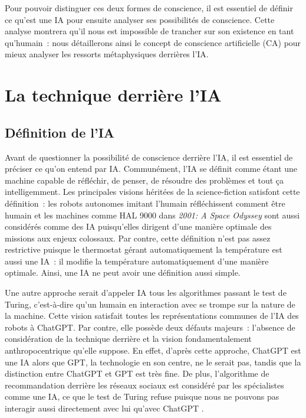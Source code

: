 \documentclass[a4paper, titlepage, 12pt]{article}
\begin{document}
	Pour pouvoir distinguer ces deux formes de conscience, il est essentiel de définir ce qu'est une IA pour ensuite analyser ses possibilités de conscience. Cette analyse montrera qu'il nous est impossible de trancher sur son existence en tant qu'humain~: nous détaillerons ainsi le concept de conscience artificielle (CA) pour mieux analyser les ressorts métaphysiques derrières l'IA.

	\newpage
	\section{La technique derrière l'IA}
	\subsection{Définition de l'IA}
	Avant de questionner la possibilité de conscience derrière l'IA, il est essentiel de préciser ce qu'on entend par IA. Communément, l'IA se définit comme étant une machine capable de réfléchir, de penser, de résoudre des problèmes et tout ça intelligemment. Les principales visions héritées de la science-fiction satisfont cette définition~: les robots autonomes imitant l'humain réfléchissent comment être humain et les machines comme HAL 9000 dans \textit{2001: A Space Odyssey} sont aussi considérés comme des IA puisqu'elles dirigent d'une manière optimale des missions aux enjeux colossaux. Par contre, cette définition n'est pas assez restrictive puisque le thermostat gérant automatiquement la température est aussi une IA~: il modifie la température automatiquement d’une manière optimale. Ainsi, une IA ne peut avoir une définition aussi simple.

	Une autre approche serait d'appeler IA tous les algorithmes passant le test de Turing, c'est-à-dire qu'un humain en interaction avec se trompe sur la nature de la machine. Cette vision satisfait toutes les représentations communes de l'IA des robots à ChatGPT. Par contre, elle possède deux défauts majeurs~: l’absence de considération de la technique derrière et la vision fondamentalement anthropocentrique qu'elle suppose. En effet, d'après cette approche, ChatGPT est une IA alors que GPT, la technologie en son centre, ne le serait pas, tandis que la distinction entre ChatGPT et GPT est très fine. De plus, l'algorithme de recommandation derrière les réseaux sociaux est considéré par les spécialistes comme une IA, ce que le test de Turing refuse puisque nous ne pouvons pas interagir aussi directement avec lui qu'avec ChatGPT \cite{turingICOMPUTINGMACHINERYINTELLIGENCE1950}.
\end{document}
